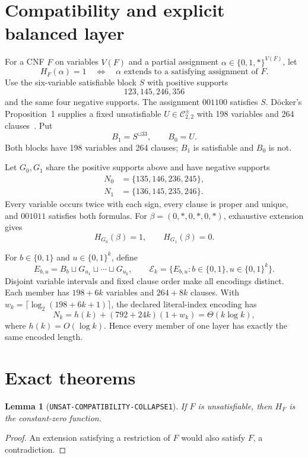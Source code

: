 \documentclass[11pt]{article}
\newtheorem{lemma}{Lemma}
\newcommand{\Core}{\mathcal C_{2,2}^{\pm}}
\begin{document}
\section{Compatibility and explicit balanced layer}
For a CNF \(F\) on variables \(V(F)\) and a partial assignment
\(\alpha\in\{0,1,*\}^{V(F)}\), let
\[
 H_F(\alpha)=1 \quad\Longleftrightarrow\quad
 \alpha\text{ extends to a satisfying assignment of }F.       \tag{1}
\]
Use the six-variable satisfiable block \(S\) with positive supports
\[
 123,145,246,356
\]
and the same four negative supports.  The assignment \(001100\) satisfies
\(S\).  D\"ocker's Proposition~1 supplies a fixed unsatisfiable
\(U\in\Core\) with 198 variables and 264 clauses~\cite{Doecker21}.  Put
\[
 B_1=S^{\sqcup 33},\qquad B_0=U.                              \tag{2}
\]
Both blocks have 198 variables and 264 clauses; \(B_1\) is satisfiable and
\(B_0\) is not.

Let \(G_0,G_1\) share the positive supports above and have negative supports
\[
 \begin{split}
 N_0&=\{135,146,236,245\},\\
 N_1&=\{136,145,235,246\}.
 \end{split}                                                   \tag{3}
\]
Every variable occurs twice with each sign, every clause is proper and
unique, and \(001011\) satisfies both formulas.  For
\(\beta=(0,*,0,*,0,*)\), exhaustive extension gives
\[
 H_{G_0}(\beta)=1,\qquad H_{G_1}(\beta)=0.                    \tag{4}
\]

For \(b\in\{0,1\}\) and \(u\in\{0,1\}^k\), define
\[
 E_{b,u}=B_b\sqcup G_{u_1}\sqcup\cdots\sqcup G_{u_k},
 \qquad \mathcal E_k=\{E_{b,u}:b\in\{0,1\},u\in\{0,1\}^k\}.
                                                                    \tag{5}
\]
Disjoint variable intervals and fixed clause order make all encodings
distinct.  Each member has \(198+6k\) variables and \(264+8k\) clauses.  With
\(w_k=\lceil\log_2(198+6k+1)\rceil\), the declared literal-index encoding has
\[
 N_k=h(k)+(792+24k)(1+w_k)=\Theta(k\log k),                  \tag{6}
\]
where \(h(k)=O(\log k)\).  Hence every member of one layer has exactly the
same encoded length.

\section{Exact theorems}
\begin{lemma}[\texttt{UNSAT-COMPATIBILITY-COLLAPSE1}]
If \(F\) is unsatisfiable, then \(H_F\) is the constant-zero function.
\end{lemma}
\begin{proof}
An extension satisfying a restriction of \(F\) would also satisfy \(F\), a
contradiction.
\end{proof}
\end{document}
